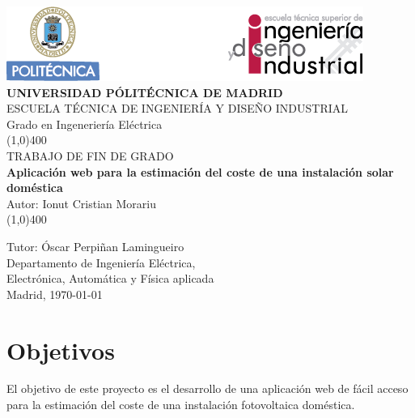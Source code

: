 \documentclass[11pt]{article}
\begin{document}
\begin{titlepage}



\begin{center}
	\includegraphics[scale=1]{cabecera}\\
	\vspace*{1cm}
	\Large{\textbf{\MakeUppercase{Universidad Pólitécnica de Madrid}}}\\[3mm]
	\Large{{\MakeUppercase{Escuela técnica de ingeniería y diseño industrial}}}\\[3mm]
	\Large {Grado en Ingeneriería Eléctrica}\\
	\vfill
	\line(1,0){400}\\
	\Large{{\MakeUppercase{Trabajo de fin de grado}}}\\
	\Huge{\textbf{Aplicación web para la estimación del coste de una instalación solar doméstica}}\\[5mm]
	\Large{Autor: Ionut Cristian Morariu}\\
	\line(1,0){400}\\
	\vfill
\end{center}
\begin{flushright}
\Large {Tutor: Óscar Perpiñan Lamingueiro}\\[3mm]
\Large{Departamento de Ingeniería Eléctrica,\\ Electrónica, Automática y Física aplicada}\\[10mm]
Madrid, \today
\end{flushright}

\end{titlepage}

\renewcommand{\baselinestretch}{1.5} %
\renewcommand{\labelitemi}{\textbullet}

\tableofcontents
\thispagestyle{empty}
\clearpage

\setcounter{page}{1}


\section{Objetivos}

El objetivo de este proyecto es el desarrollo de una aplicación web de fácil acceso para la estimación del coste de una instalación fotovoltaica doméstica.\\
\end{document}
